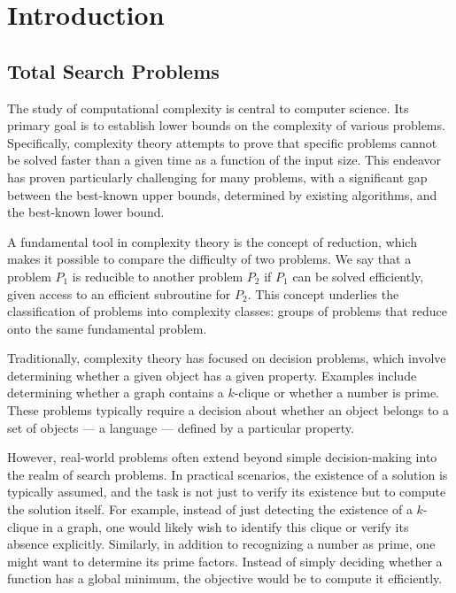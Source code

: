 \setchapterpreamble[u]{\margintoc}
\chapter{Introduction}\label{ch:introduction}

\section{Total Search Problems}\label{sec:intro_total_search_problems}

The study of computational complexity is central to computer science. Its primary goal is to establish lower bounds on the complexity of various problems. Specifically, complexity theory attempts to prove that specific problems cannot be solved faster than a given time as a function of the input size. This endeavor has proven particularly challenging for many problems, with a significant gap between the best-known upper bounds, determined by existing algorithms, and the best-known lower bound.

A fundamental tool in complexity theory is the concept of reduction, which makes it possible to compare the difficulty of two problems. We say that a problem $P_1$ is reducible to another problem $P_2$ if $P_1$ can be solved efficiently, given access to an efficient subroutine for $P_2$. This concept underlies the classification of problems into complexity classes: groups of problems that reduce onto the same fundamental problem.

Traditionally, complexity theory has focused on decision problems, which involve determining whether a given object has a given property. Examples include determining whether a graph contains a $k$-clique or whether a number is prime. These problems typically require a decision about whether an object belongs to a set of objects --- a language --- defined by a particular property.

However, real-world problems often extend beyond simple decision-making into the realm of search problems. In practical scenarios, the existence of a solution is typically assumed, and the task is not just to verify its existence but to compute the solution itself. For example, instead of just detecting the existence of a $k$-clique in a graph, one would likely wish to identify this clique or verify its absence explicitly. Similarly, in addition to recognizing a number as prime, one might want to determine its prime factors. Instead of simply deciding whether a function has a global minimum, the objective would be to compute it efficiently.

